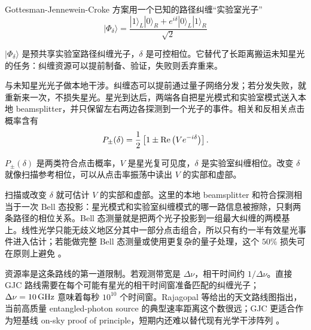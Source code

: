 Gottesman-Jennewein-Croke 方案用一个已知的路径纠缠“实验室光子”
\begin{equation}
  |\Phi_\delta\rangle
  =
  \frac{|1\rangle_L|0\rangle_R
  +
  e^{i\delta}
  |0\rangle_L|1\rangle_R}{\sqrt2}
  \label{eq:ch17-lab-entangled-photon}
\end{equation}
\begin{formulaexplain}[公式 (17.5) 解读]
\(|\Phi_\delta\rangle\) 是预共享实验室路径纠缠光子，\(\delta\) 是可控相位。它替代了长距离搬运未知星光的任务：纠缠资源可以提前制备、验证，失败则丢弃重来。
\end{formulaexplain}
与未知星光光子做本地干涉。纠缠态可以提前通过量子网络分发；若分发失败，就重新来一次，不损失星光。星光到达后，两端各自把星光模式和实验室模式送入本地 beamsplitter，并只保留左右两边各探测到一个光子的事件。相关和反相关点击概率含有
\begin{equation}
  P_{\pm}(\delta)
  =
  \frac{1}{2}
  \left[
  1
  \pm
  {\rm Re}
  \left(
  V e^{-i\delta}
  \right)
  \right].
  \label{eq:ch17-gjc-probability}
\end{equation}
\begin{formulaexplain}[公式 (17.6) 解读]
\(P_\pm(\delta)\) 是两类符合点击概率，\(V\) 是星光复可见度，\(\delta\) 是实验室纠缠相位。改变 \(\delta\) 就像扫描参考相位，可以从点击率振荡中读出 \(V\) 的实部和虚部。
\end{formulaexplain}
扫描或改变 \(\delta\) 就可估计 \(V\) 的实部和虚部。这里的本地 beamsplitter 和符合探测相当于一次 Bell 态投影：星光模式和实验室纠缠模式的哪一路信息被擦除，只剩两条路径的相位关系。Bell 态测量就是把两个光子投影到一组最大纠缠的两模基上。线性光学只能无歧义地区分其中一部分点击组合，所以只有约一半有效星光事件进入估计；若能做完整 Bell 态测量或使用更复杂的量子处理，这个 \(50\%\) 损失可在原则上避免 \citep{1982Natur.299..802W,1993PhRvL..70.1895B,2012PhRvL.109g0503G}。

资源率是这条路线的第一道限制。若观测带宽是 \(\Delta\nu\)，相干时间约 \(1/\Delta\nu\)。直接 GJC 路线需要在每个可能有星光的相干时间窗准备匹配的纠缠光子；\(\Delta\nu=10\,{\rm GHz}\) 意味着每秒 \(10^{10}\) 个时间窗。Rajagopal 等给出的天文路线图指出，当前高质量 entangled-photon source 的典型速率距离这个数很远；GJC 更适合作为短基线 on-sky proof of principle，短期内还难以替代现有光学干涉阵列 \citep{2024SPIE13095E..1NR,2012PhRvL.109g0503G}。

